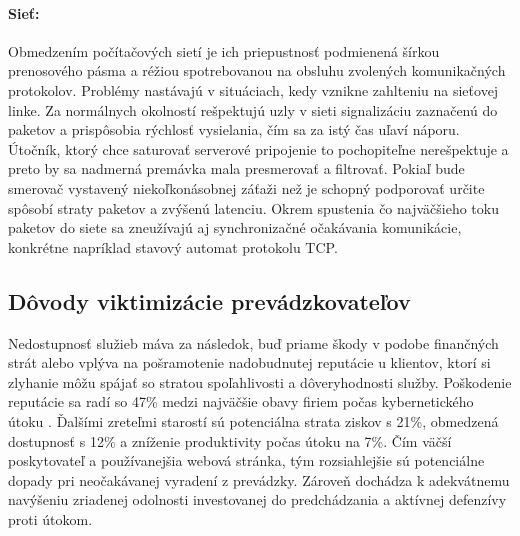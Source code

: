 \documentclass[12pt, a4paper]{article}
\begin{document}
\paragraph{Sieť:}
Obmedzením počítačových sietí je ich priepustnosť podmienená šírkou prenosového pásma a réžiou 
spotrebovanou na obsluhu zvolených komunikačných protokolov. Problémy nastávajú v situáciach, kedy vznikne 
zahlteniu na sieťovej linke. Za normálnych okolností rešpektujú uzly v sieti signalizáciu zaznačenú do 
paketov a prispôsobia rýchlosť vysielania, čím sa za istý čas uľaví náporu. Útočník, ktorý chce saturovať 
serverové pripojenie to  pochopiteľne nerešpektuje a preto by sa nadmerná premávka mala presmerovať a 
filtrovať. Pokiaľ bude smerovač vystavený niekoľkonásobnej záťaži než je schopný podporovať určite spôsobí 
straty paketov a zvýšenú latenciu. Okrem spustenia čo najväčšieho toku paketov do siete sa zneužívajú aj
synchronizačné očakávania komunikácie, konkrétne napríklad stavový automat protokolu TCP.

\subsection{Dôvody viktimizácie prevádzkovateľov}
Nedostupnosť služieb máva za následok, buď priame škody v podobe finančných strát alebo vplýva na 
pošramotenie nadobudnutej reputácie u klientov, ktorí si zlyhanie môžu spájať so stratou spoľahlivosti a 
dôveryhodnosti služby. Poškodenie reputácie sa radí so 47\% medzi najväčšie obavy firiem počas 
kybernetického útoku \cite{radware-ddos}. Ďalšími zreteľmi starostí sú potenciálna strata ziskov s 21\%, 
obmedzená dostupnosť s 12\% a zníženie produktivity počas útoku na 7\%. Čím väčší poskytovateľ a 
používanejšia webová stránka, tým rozsiahlejšie sú potenciálne dopady pri neočakávanej vyradení z prevádzky. 
Zároveň dochádza k adekvátnemu navýšeniu zriadenej odolnosti investovanej do predchádzania a aktívnej 
defenzívy proti útokom. 
\end{document}
